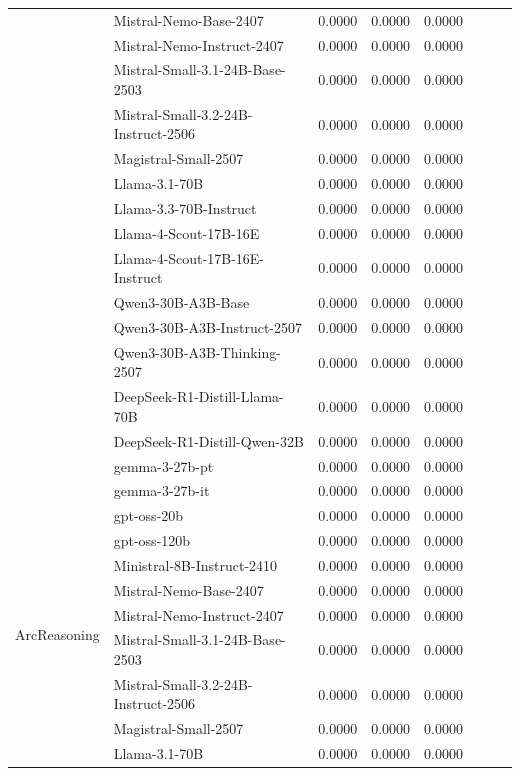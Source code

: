 \begin{table}[h]
{\begin{tabular}{l|lcccc|cc}
        & Mistral-Nemo-Base-2407 & 0.0000 & 0.0000 & 0.0000 \\
        & Mistral-Nemo-Instruct-2407 & 0.0000 & 0.0000 & 0.0000 \\
        & Mistral-Small-3.1-24B-Base-2503 & 0.0000 & 0.0000 & 0.0000 \\
        & Mistral-Small-3.2-24B-Instruct-2506 & 0.0000 & 0.0000 & 0.0000 \\
        & Magistral-Small-2507 & 0.0000 & 0.0000 & 0.0000 \\
        & Llama-3.1-70B & 0.0000 & 0.0000 & 0.0000 \\
        & Llama-3.3-70B-Instruct & 0.0000 & 0.0000 & 0.0000 \\
        & Llama-4-Scout-17B-16E & 0.0000 & 0.0000 & 0.0000 \\
        & Llama-4-Scout-17B-16E-Instruct & 0.0000 & 0.0000 & 0.0000 \\
        & Qwen3-30B-A3B-Base & 0.0000 & 0.0000 & 0.0000 \\
        & Qwen3-30B-A3B-Instruct-2507 & 0.0000 & 0.0000 & 0.0000 \\
        & Qwen3-30B-A3B-Thinking-2507 & 0.0000 & 0.0000 & 0.0000 \\
        & DeepSeek-R1-Distill-Llama-70B & 0.0000 & 0.0000 & 0.0000 \\
        & DeepSeek-R1-Distill-Qwen-32B & 0.0000 & 0.0000 & 0.0000 \\
        & gemma-3-27b-pt & 0.0000 & 0.0000 & 0.0000 \\
        & gemma-3-27b-it & 0.0000 & 0.0000 & 0.0000 \\
        \midrule
        \multirow{19}{*}{ArcReasoning} & gpt-oss-20b & 0.0000 & 0.0000 & 0.0000 \\
        & gpt-oss-120b & 0.0000 & 0.0000 & 0.0000 \\
        & Ministral-8B-Instruct-2410 & 0.0000 & 0.0000 & 0.0000 \\
        & Mistral-Nemo-Base-2407 & 0.0000 & 0.0000 & 0.0000 \\
        & Mistral-Nemo-Instruct-2407 & 0.0000 & 0.0000 & 0.0000 \\
        & Mistral-Small-3.1-24B-Base-2503 & 0.0000 & 0.0000 & 0.0000 \\
        & Mistral-Small-3.2-24B-Instruct-2506 & 0.0000 & 0.0000 & 0.0000 \\
        & Magistral-Small-2507 & 0.0000 & 0.0000 & 0.0000 \\
        & Llama-3.1-70B & 0.0000 & 0.0000 & 0.0000 \\

\end{tabular}}
\end{table}

